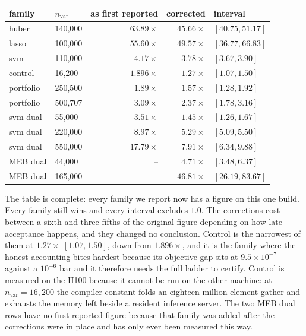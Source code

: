 \documentclass[11pt]{article}
\begin{document}
\begin{center}
\begin{tabular}{llrrl}
\toprule
family & $n_{\mathrm{var}}$ & as first reported & corrected & interval \\
\midrule
huber     & 140{,}000 & $63.89\times$ & $45.66\times$ & $[40.75, 51.17]$ \\
lasso     & 100{,}000 & $55.60\times$ & $49.57\times$ & $[36.77, 66.83]$ \\
svm       & 110{,}000 & $4.17\times$  & $3.78\times$  & $[3.67, 3.90]$ \\
control   & 16{,}200  & $1.896\times$ & $1.27\times$  & $[1.07, 1.50]$ \\
portfolio & 250{,}500 & $1.89\times$  & $1.57\times$  & $[1.28, 1.92]$ \\
portfolio & 500{,}707 & $3.09\times$  & $2.37\times$  & $[1.78, 3.16]$ \\
svm dual  & 55{,}000  & $3.51\times$  & $1.45\times$  & $[1.26, 1.67]$ \\
svm dual  & 220{,}000 & $8.97\times$  & $5.29\times$  & $[5.09, 5.50]$ \\
svm dual  & 550{,}000 & $17.79\times$ & $7.91\times$  & $[6.34, 9.88]$ \\
MEB dual  & 44{,}000  & --            & $4.71\times$  & $[3.48, 6.37]$ \\
MEB dual  & 165{,}000 & --            & $46.81\times$ & $[26.19, 83.67]$ \\
\bottomrule
\end{tabular}
\end{center}

The table is complete: every family we report now has a figure on this one
build. Every family still wins and every interval excludes $1.0$. The
corrections cost between a sixth and three fifths of the original figure
depending on how late acceptance happens, and they changed no conclusion.
Control is the narrowest of them at $1.27\times$ $[1.07, 1.50]$, down from
$1.896\times$, and it is the family where the honest accounting bites hardest
because its objective gap sits at $9.5\times10^{-7}$ against a $10^{-6}$ bar
and it therefore needs the full ladder to certify. Control is measured on the
H100 because it cannot be run on the other machine: at
$n_{\mathrm{var}} = 16{,}200$ the compiler constant-folds an
eighteen-million-element gather and exhausts the memory left beside a
resident inference server. The two MEB dual rows have no first-reported
figure because that family was added after the corrections were in place and
has only ever been measured this way.
\end{document}
